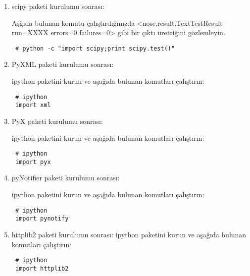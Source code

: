 \documentclass[a4paper,10pt]{article}
\begin{document}
\begin{enumerate}
\item scipy paketi kurulumu sonrası:

Aşğıda bulunan komutu çalıştırdığınızda <nose.result.TextTestResult run=XXXX errors=0 failures=0> gibi bir çıktı ürettiğini gözlemleyin.
\begin{verbatim}
 # python -c "import scipy;print scipy.test()"
\end{verbatim}

\item PyXML paketi kurulumu sonrası:

ipython paketini kurun ve aşağıda bulunan komutları çalıştırın:
\begin{verbatim}
 # ipython
 import xml
\end{verbatim}


\item PyX paketi kurulumu sonrası:

ipython paketini kurun ve aşağıda bulunan komutları çalıştırın:
\begin{verbatim}
 # ipython
 import pyx
\end{verbatim}

\item pyNotifier paketi kurulumu sonrası:

ipython paketini kurun ve aşağıda bulunan komutları çalıştırın:
\begin{verbatim}
 # ipython
 import pynotify
\end{verbatim}


\item httplib2 paketi kurulumu sonrası:
ipython paketini kurun ve aşağıda bulunan komutları çalıştırın:
\begin{verbatim}
 # ipython
 import httplib2
\end{verbatim}


\end{enumerate}
\end{document}
